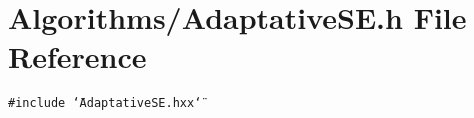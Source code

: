 \section{Algorithms/Adaptative\-SE.h File Reference}
\label{AdaptativeSE_8h}
{\tt \#include \char`\"{}Adaptative\-SE.hxx\char`\"{}}\par
